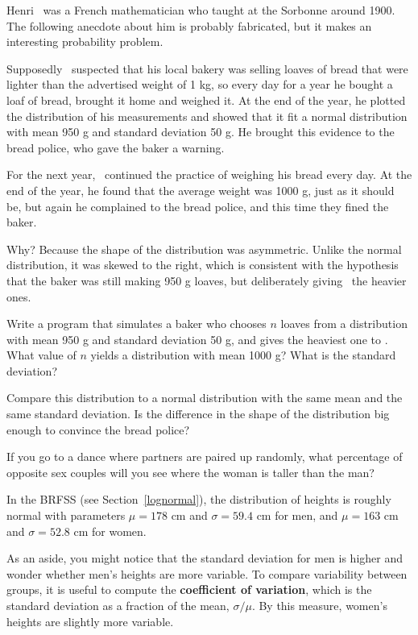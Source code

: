 \documentclass[12pt]{book}
\begin{document}
Henri \Poincare~was a French mathematician who taught at the Sorbonne
around 1900.  The following anecdote about him is probably fabricated,
but it makes an interesting probability problem.

Supposedly \Poincare~suspected that his local bakery was selling
loaves of bread that were lighter than the advertised weight of 1 kg,
so every day for a year he bought a loaf of bread, brought it home and
weighed it.  At the end of the year, he plotted the distribution of
his measurements and showed that it fit a normal distribution with
mean 950 g and standard deviation 50 g.  He brought this evidence to
the bread police, who gave the baker a warning.

For the next year, \Poincare~continued the practice of weighing his
bread every day.  At the end of the year, he found that the average
weight was 1000 g, just as it should be, but again he complained to
the bread police, and this time they fined the baker.

Why?  Because the shape of the distribution was asymmetric.  Unlike
the normal distribution, it was skewed to the right, which is
consistent with the hypothesis that the baker was still making 950 g
loaves, but deliberately giving \Poincare~the heavier ones.


\begin{ex}

Write a program that simulates a baker who chooses $n$ loaves from a
distribution with mean 950 g and standard deviation 50 g, and gives
the heaviest one to \Poincare.  What value of $n$ yields a
distribution with mean 1000 g?  What is the standard deviation?

Compare this distribution to a normal distribution with the same mean
and the same standard deviation.  Is the difference in the shape of
the distribution big enough to convince the bread police?

\end{ex}


\begin{ex}
\label{coef_var}

If you go to a dance where partners are paired up randomly, what
percentage of opposite sex couples will you see where the woman is
taller than the man?

In the BRFSS (see Section~\ref{lognormal}), the distribution of
heights is roughly normal with parameters $\mu=178$ cm and
$\sigma=59.4$ cm for men, and $\mu=163$ cm and $\sigma=52.8$ cm for
women.

As an aside, you might notice that the standard deviation for men is
higher and wonder whether men's heights are more variable.  To compare
variability between groups, it is useful to compute the {\bf
  coefficient of variation}, which is the standard deviation as a
fraction of the mean, $\sigma / \mu$.  By this measure, women's
heights are slightly more variable.


\end{ex}
\end{document}
